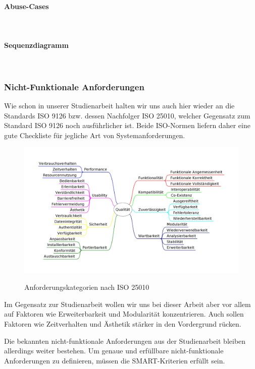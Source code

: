 \paragraph{Abuse-Cases}~\\

\paragraph{Sequenzdiagramm}~\\

\subsubsection{Nicht-Funktionale Anforderungen}
Wie schon in unserer Studienarbeit halten wir uns auch hier wieder an die Standards ISO 9126\cite{ISO9126} bzw. dessen Nachfolger ISO 25010\cite{ISO9126_ISO25010}, welcher Gegensatz zum Standard ISO 9126 noch ausführlicher ist. Beide ISO-Normen liefern daher eine gute Checkliste für jegliche Art von Systemanforderungen.

\begin{figure}[h]
	\centering
	\includegraphics[width=1\linewidth]{img/anforderungen/quality}
	\caption[Anforderungskategorien nach ISO 25010]{Anforderungskategorien nach  ISO 25010}\cite{ISO25010_Bild}
	\label{fig:ISO 25010}
\end{figure}

Im Gegensatz zur Studienarbeit wollen wir uns bei dieser Arbeit aber vor allem auf Faktoren wie Erweiterbarkeit und Modularität konzentrieren. Auch sollen Faktoren wie Zeitverhalten und Ästhetik stärker in den Vordergrund rücken. 

Die bekannten nicht-funktionale Anforderungen aus der Studienarbeit bleiben allerdings weiter bestehen. Um genaue und erfüllbare nicht-funktionale Anforderungen zu definieren, müssen die SMART-Kriterien \cite{SMART} erfüllt sein.

